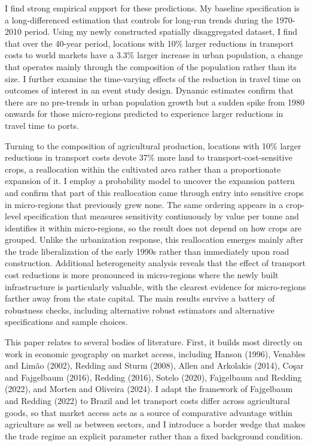 \documentclass[11pt]{article}
\begin{document}
I find strong empirical support for these predictions. My baseline specification is a long-differenced estimation that controls for long-run trends during the 1970-2010 period. Using my newly constructed spatially disaggregated dataset, I find that over the 40-year period, locations with 10\% larger reductions in transport costs to world markets have a 3.3\% larger increase in urban population, a change that operates mainly through the composition of the population rather than its size. I further examine the time-varying effects of the reduction in travel time on outcomes of interest in an event study design. Dynamic estimates confirm that there are no pre-trends in urban population growth but a sudden spike from 1980 onwards for those micro-regions predicted to experience larger reductions in travel time to ports.

Turning to the composition of agricultural production, locations with 10\% larger reductions in transport costs devote 37\% more land to transport-cost-sensitive crops, a reallocation within the cultivated area rather than a proportionate expansion of it. I employ a probability model to uncover the expansion pattern and confirm that part of this reallocation came through entry into sensitive crops in micro-regions that previously grew none. The same ordering appears in a crop-level specification that measures sensitivity continuously by value per tonne and identifies it within micro-regions, so the result does not depend on how crops are grouped. Unlike the urbanization response, this reallocation emerges mainly after the trade liberalization of the early 1990s rather than immediately upon road construction. Additional heterogeneity analysis reveals that the effect of transport cost reductions is more pronounced in micro-regions where the newly built infrastructure is particularly valuable, with the clearest evidence for micro-regions farther away from the state capital. The main results survive a battery of robustness checks, including alternative robust estimators and alternative specifications and sample choices.

This paper relates to several bodies of literature. First, it builds most directly on work in economic geography on market access, including Hanson (1996), Venables and Limão (2002), Redding and Sturm (2008), Allen and Arkolakis (2014), Coşar and Fajgelbaum (2016), Redding (2016), Sotelo (2020), Fajgelbaum and Redding (2022), and Morten and Oliveira (2024). I adapt the framework of Fajgelbaum and Redding (2022) to Brazil and let transport costs differ across agricultural goods, so that market access acts as a source of comparative advantage within agriculture as well as between sectors, and I introduce a border wedge that makes the trade regime an explicit parameter rather than a fixed background condition.
\end{document}
